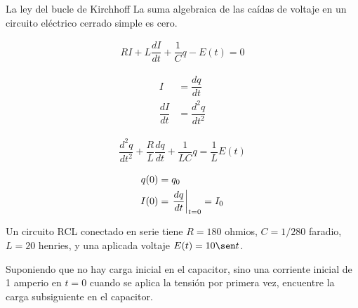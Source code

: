 {La ley del bucle de Kirchhoff}	
La suma algebraica de las caídas de voltaje en un circuito eléctrico cerrado simple es cero.


{}
\begin{align*}
	RI + L\dfrac{dI}{dt}+\dfrac{1}{C}q-E(t)=0
\end{align*}


{}
\begin{align*}
	I&=\dfrac{dq}{dt}\\
	\dfrac{dI}{dt}&=\dfrac{d^{2}q}{dt^{2}}
\end{align*}



{}
\begin{align*}
	\dfrac{d^{2}q}{dt^{2}} 
	+\dfrac{R}{L}\dfrac{dq}{dt}
	+\dfrac{1}{LC}q = 
	\dfrac{1}{L}E(t)
\end{align*}


{}
\begin{align*}
	q(0) &= q_{0}\\
	I(0) &= \left. \dfrac{dq}{dt} \right|_{t=0}=I_{0}
\end{align*}


{}
\begin{problema}
	Un circuito RCL conectado en serie tiene $R = 180$ ohmios, $C = 1/280$ faradio, $L = 20$ henries, y una aplicada
	voltaje $E(t) = 10 \sen t$. 
	
	
	Suponiendo que no hay carga inicial en el capacitor, sino una corriente inicial de 1 amperio en
	$t = 0$ cuando se aplica la tensión por primera vez, encuentre la carga subsiguiente en el capacitor.
\end{problema}



